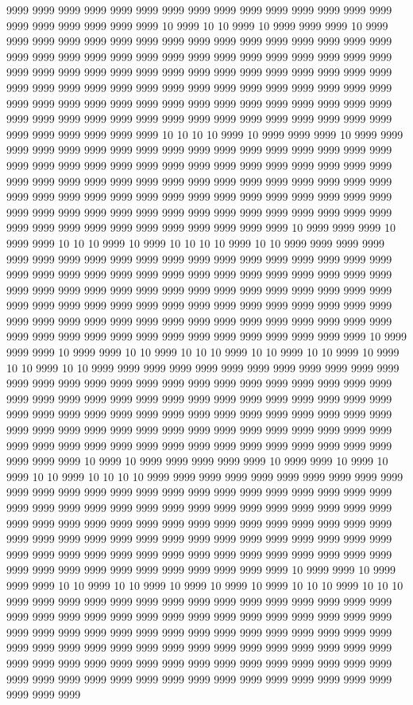 9999 9999 9999 9999 9999 9999 9999 9999 9999 9999 9999 9999 9999 9999 9999 9999 9999 9999 9999 9999 9999 10 9999 10 10 9999 10 9999 9999 9999 10 9999 9999 9999 9999 9999 9999 9999 9999 9999 9999 9999 9999 9999 9999 9999 9999 9999 9999 9999 9999 9999 9999 9999 9999 9999 9999 9999 9999 9999 9999 9999 9999 9999 9999 9999 9999 9999 9999 9999 9999 9999 9999 9999 9999 9999 9999 9999 9999 9999 9999 9999 9999 9999 9999 9999 9999 9999 9999 9999 9999 9999 9999 9999 9999 9999 9999 9999 9999 9999 9999 9999 9999 9999 9999 9999 9999 9999 9999 9999 9999 9999 9999 9999 9999 9999 9999 9999 9999 9999 9999 9999 9999 9999 9999 9999 9999 9999 10 10 10 10 9999 10 9999 9999 9999 10 9999 9999 9999 9999 9999 9999 9999 9999 9999 9999 9999 9999 9999 9999 9999 9999 9999 9999 9999 9999 9999 9999 9999 9999 9999 9999 9999 9999 9999 9999 9999 9999 9999 9999 9999 9999 9999 9999 9999 9999 9999 9999 9999 9999 9999 9999 9999 9999 9999 9999 9999 9999 9999 9999 9999 9999 9999 9999 9999 9999 9999 9999 9999 9999 9999 9999 9999 9999 9999 9999 9999 9999 9999 9999 9999 9999 9999 9999 9999 9999 9999 9999 9999 9999 9999 9999 9999 9999 10 9999 9999 9999 10 9999 9999 10 10 10 9999 10 9999 10 10 10 10 9999 10 10 9999 9999 9999 9999 9999 9999 9999 9999 9999 9999 9999 9999 9999 9999 9999 9999 9999 9999 9999 9999 9999 9999 9999 9999 9999 9999 9999 9999 9999 9999 9999 9999 9999 9999 9999 9999 9999 9999 9999 9999 9999 9999 9999 9999 9999 9999 9999 9999 9999 9999 9999 9999 9999 9999 9999 9999 9999 9999 9999 9999 9999 9999 9999 9999 9999 9999 9999 9999 9999 9999 9999 9999 9999 9999 9999 9999 9999 9999 9999 9999 9999 9999 9999 9999 9999 9999 9999 9999 9999 9999 9999 9999 9999 10 9999 9999 9999 10 9999 9999 10 10 9999 10 10 10 9999 10 10 9999 10 10 9999 10 9999 10 10 9999 10 10 9999 9999 9999 9999 9999 9999 9999 9999 9999 9999 9999 9999 9999 9999 9999 9999 9999 9999 9999 9999 9999 9999 9999 9999 9999 9999 9999 9999 9999 9999 9999 9999 9999 9999 9999 9999 9999 9999 9999 9999 9999 9999 9999 9999 9999 9999 9999 9999 9999 9999 9999 9999 9999 9999 9999 9999 9999 9999 9999 9999 9999 9999 9999 9999 9999 9999 9999 9999 9999 9999 9999 9999 9999 9999 9999 9999 9999 9999 9999 9999 9999 9999 9999 9999 9999 9999 9999 9999 9999 9999 10 9999 10 9999 9999 9999 9999 9999 10 9999 9999 10 9999 10 9999 10 10 9999 10 10 10 10 9999 9999 9999 9999 9999 9999 9999 9999 9999 9999 9999 9999 9999 9999 9999 9999 9999 9999 9999 9999 9999 9999 9999 9999 9999 9999 9999 9999 9999 9999 9999 9999 9999 9999 9999 9999 9999 9999 9999 9999 9999 9999 9999 9999 9999 9999 9999 9999 9999 9999 9999 9999 9999 9999 9999 9999 9999 9999 9999 9999 9999 9999 9999 9999 9999 9999 9999 9999 9999 9999 9999 9999 9999 9999 9999 9999 9999 9999 9999 9999 9999 9999 9999 9999 9999 9999 9999 9999 9999 9999 9999 9999 9999 9999 9999 9999 10 9999 9999 10 9999 9999 9999 10 10 9999 10 10 9999 10 9999 10 9999 10 9999 10 10 10 9999 10 10 10 9999 9999 9999 9999 9999 9999 9999 9999 9999 9999 9999 9999 9999 9999 9999 9999 9999 9999 9999 9999 9999 9999 9999 9999 9999 9999 9999 9999 9999 9999 9999 9999 9999 9999 9999 9999 9999 9999 9999 9999 9999 9999 9999 9999 9999 9999 9999 9999 9999 9999 9999 9999 9999 9999 9999 9999 9999 9999 9999 9999 9999 9999 9999 9999 9999 9999 9999 9999 9999 9999 9999 9999 9999 9999 9999 9999 9999 9999 9999 9999 9999 9999 9999 9999 9999 9999 9999 9999 9999 9999 9999 9999 9999 